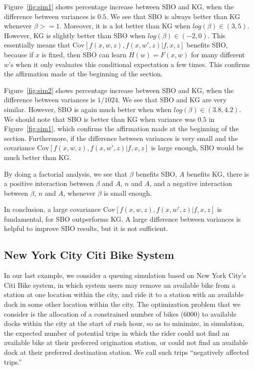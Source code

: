 \documentclass{article}
\newcommand{\w}{w}
\newcommand{\z}{z}
\begin{document}
Figure~\ref{fig:sim1} shows percentage increase between SBO and KG, when the difference between variances is $0.5$. We see that SBO is always better than KG whenever $\beta >= 1$. Moreover, it is a lot better than KG when $log(\beta)\in(3,5)$. However, KG is slightly better than SBO when $log(\beta)\in(-2,0)$. This essentially means that $\mbox{Cov}\left[f\left(x,\w,\z\right),f\left(x,\w',\z\right)|f,x,z\right]$ benefits SBO, because if $x$ is fixed, then SBO can learn $H(\w)=F\left(x,\w\right)$ for many different $\w$'s when it only evaluates this conditional expectation a few times. This confirms the affirmation made at the beginning of the section.

Figure~\ref{fig:sim2} shows percentage increase between SBO and KG, when the difference between variances is $1/1024$. We see that SBO and KG are very similar. However, SBO is again much better when when $log(\beta)\in(3.8,4.2)$. We should note that SBO is better than KG when variance was $0.5$ in Figure~\ref{fig:sim1}, which confirms the affirmation made at the beginning of the section. Furthermore, if the difference between variances is very small and the covariance $\mbox{Cov}\left[f\left(x,\w,\z\right),f\left(x,\w',\z\right)|f,x,z\right]$ is large enough, SBO would be much better than KG. 

By doing a factorial analysis, we see that $\beta$ benefits SBO, $A$ benefits KG, there is a positive interaction between $\beta$ and $A$, $n$ and $A$, and a negative interaction between $\beta$, $n$ and $A$, whenever $\beta$ is small enough. 

In conclusion, a large covariance $\mbox{Cov}\left[f\left(x,\w,\z\right),f\left(x,\w',\z\right)|f,x,z\right]$ is fundamental, for SBO outperforms KG. A large difference between variances is helpful to improve SBO results, but it is not sufficient.

\subsection{New York City Citi Bike System}
\label{sec:citibike}

In our last example, we consider a queuing simulation based on New York City's Citi Bike system, in which system users may remove an available bike from a station at one location within the city, and ride it to a station with an available dock in some other location within the city.  The optimization problem that we consider is the allocation of a constrained number of bikes (6000) to available docks within the city at the start of rush hour, so as to minimize, in simulation, the expected number of potential trips in which the rider could not find an available bike at their preferred origination station, or could not find an available dock at their preferred destination station.  We call such trips ``negatively affected trips.''
\end{document}
